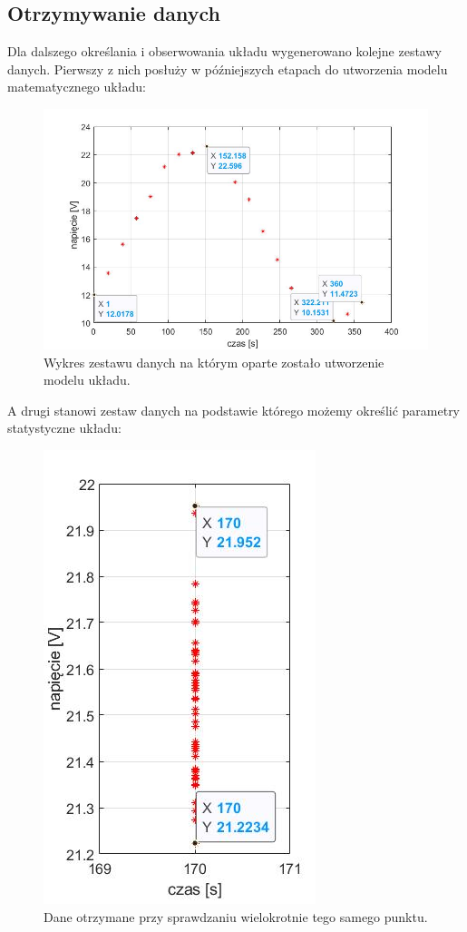 \documentclass[a4paper, 12pt]{mwart}
\begin{document}
	\newpage
		\subsection{Otrzymywanie danych}
			Dla dalszego określania i obserwowania układu wygenerowano kolejne zestawy danych. Pierwszy z nich
			posłuży w późniejszych etapach do utworzenia modelu matematycznego układu:
			\begin{figure}[h]
				\begin{center}
					\includegraphics[width = 0.7\linewidth]{graphs/1B-a.jpg}
					\caption{Wykres zestawu danych na którym oparte zostało utworzenie modelu układu.}
					\label{fig:1B}
				\end{center}
			\end{figure}

			A drugi stanowi zestaw danych na podstawie którego możemy określić parametry statystyczne układu:
			\begin{figure}[h]
				\begin{center}
					\includegraphics[height = 0.35\textheight]{graphs/1C-a.jpg}
					\caption{Dane otrzymane przy sprawdzaniu wielokrotnie tego samego punktu.}
					\label{fig:1C}
				\end{center}
			\end{figure}
\end{document}
